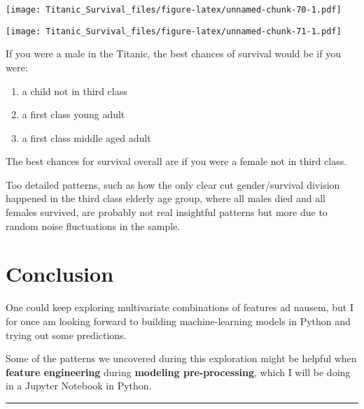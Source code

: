 \documentclass[]{article}
\newenvironment{Shaded}{\begin{snugshade}}{\end{snugshade}}
\newcommand{\KeywordTok}[1]{\textcolor[rgb]{0.13,0.29,0.53}{\textbf{#1}}}
\newcommand{\DataTypeTok}[1]{\textcolor[rgb]{0.13,0.29,0.53}{#1}}
\newcommand{\DecValTok}[1]{\textcolor[rgb]{0.00,0.00,0.81}{#1}}
\newcommand{\StringTok}[1]{\textcolor[rgb]{0.31,0.60,0.02}{#1}}
\newcommand{\CommentTok}[1]{\textcolor[rgb]{0.56,0.35,0.01}{\textit{#1}}}
\newcommand{\OperatorTok}[1]{\textcolor[rgb]{0.81,0.36,0.00}{\textbf{#1}}}
\newcommand{\NormalTok}[1]{#1}
\providecommand{\tightlist}{%
  \setlength{\itemsep}{0pt}\setlength{\parskip}{0pt}}
\begin{document}
\texttt{[image: Titanic\_Survival\_files/figure-latex/unnamed-chunk-70-1.pdf]}

\begin{Shaded}
\end{Shaded}

\texttt{[image: Titanic\_Survival\_files/figure-latex/unnamed-chunk-71-1.pdf]}

If you were a male in the Titanic, the best chances of survival would be
if you were:

\begin{enumerate}
\def\labelenumi{\arabic{enumi}.}
\tightlist
\item
  a child not in third class
\item
  a first class young adult
\item
  a first class middle aged adult
\end{enumerate}

The best chances for survival overall are if you were a female not in
third class.

Too detailed patterns, such as how the only clear cut gender/survival
division happened in the third class elderly age group, where all males
died and all females survived, are probably not real insightful patterns
but more due to random noise fluctuations in the sample.

\hypertarget{conclusion-link}{\section{Conclusion}\label{conclusion-link}}

One could keep exploring multivariate combinations of features ad
nausem, but I for once am looking forward to building machine-learning
models in Python and trying out some predictions.

Some of the patterns we uncovered during this exploration might be
helpful when \textbf{feature engineering} during \textbf{modeling
pre-processing}, which I will be doing in a Jupyter Notebook in Python.

\begin{center}\rule{0.5\linewidth}{\linethickness}\end{center}
\end{document}
